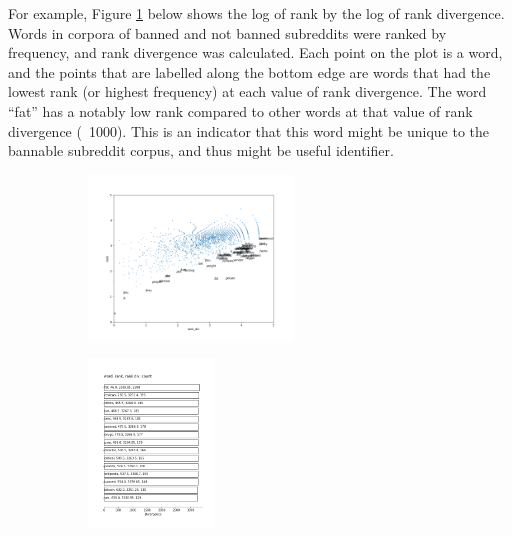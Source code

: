 \documentclass[11pt]{article}[twocolumn]
\begin{document}
For example, Figure \ref{fig:rankshift} below shows the log of rank by the log of rank divergence.  Words in corpora of banned and not banned subreddits were ranked by frequency, and rank divergence was calculated. Each point on the plot is a word, and the points that are labelled along the bottom edge are words that had the lowest rank (or highest frequency) at each value of rank divergence.  The word ``fat'' has a notably low rank compared to other words at that value of rank divergence (~1000).  This is an indicator that this word might be unique to the bannable subreddit corpus, and thus might be useful identifier.

\begin{figure}[H]
    \caption{Log of Rank Divergence by Log of Rank and Top 15 Words with Highest Rank Divergence}
    \centering
    \begin{subfigure}{\textwidth}
        \centering
        \includegraphics[width=0.6\textwidth]{rankdiv_scatter.png}
    \end{subfigure}
    \begin{subfigure}{\textwidth}
        \centering
        \includegraphics[width=0.37\textwidth]{Subreddits_rankdiv_shift.png}
    \end{subfigure}  \\
    \label{fig:rankshift}
\end{figure}
\end{document}
